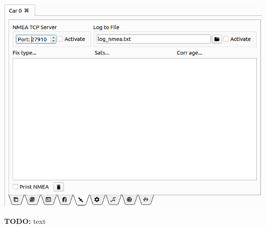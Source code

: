 \documentclass[12pt]{article} %
\newcommand{\todo}[1]{{\color{red} \textbf{TODO:} #1}}
\begin{document}
\noindent\begin{minipage}{0.5\textwidth}
  \noindent \includegraphics[width=\textwidth]{./screens/Car_GPS.png}
\end{minipage}
\begin{minipage}{0.5\textwidth} %
  \todo{text}
\end{minipage}
\end{document}
